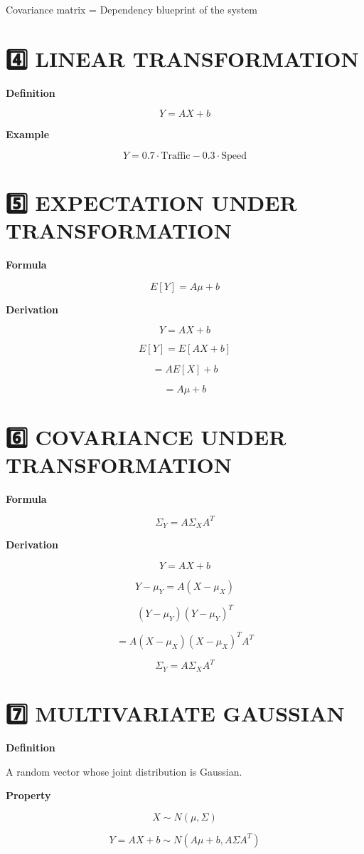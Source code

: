 \documentclass[12pt]{article}
\begin{document}
Covariance matrix = Dependency blueprint of the system

\section*{4️⃣ LINEAR TRANSFORMATION}

\textbf{Definition}

\[
Y = AX + b
\]

\textbf{Example}

\[
Y = 0.7 \cdot \text{Traffic} - 0.3 \cdot \text{Speed}
\]

\section*{5️⃣ EXPECTATION UNDER TRANSFORMATION}

\textbf{Formula}

\[
E[Y] = A\mu + b
\]

\textbf{Derivation}

\[
Y = AX + b
\]

\[
E[Y] = E[AX + b]
\]

\[
= A E[X] + b
\]

\[
= A\mu + b
\]

\section*{6️⃣ COVARIANCE UNDER TRANSFORMATION}

\textbf{Formula}

\[
\Sigma_Y = A \Sigma_X A^T
\]

\textbf{Derivation}

\[
Y = AX + b
\]

\[
Y - \mu_Y = A(X - \mu_X)
\]

\[
(Y - \mu_Y)(Y - \mu_Y)^T
\]

\[
= A(X - \mu_X)(X - \mu_X)^T A^T
\]

\[
\Sigma_Y = A \Sigma_X A^T
\]

\section*{7️⃣ MULTIVARIATE GAUSSIAN}

\textbf{Definition}

A random vector whose joint distribution is Gaussian.

\textbf{Property}

\[
X \sim N(\mu, \Sigma)
\]

\[
Y = AX + b \sim N(A\mu + b, A\Sigma A^T)
\]
\end{document}
